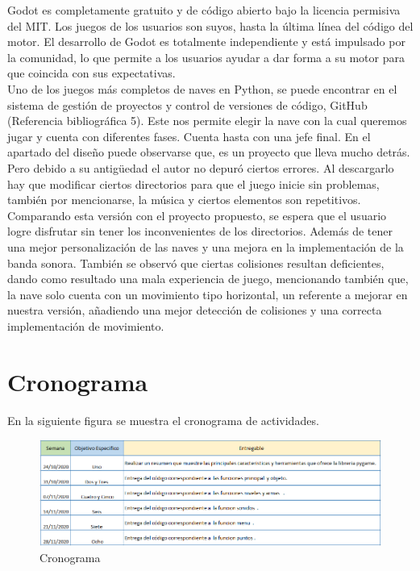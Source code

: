 \documentclass[12pt,letterpaper]{article}
\begin{document}
\indent Godot es completamente gratuito y de código abierto bajo la licencia permisiva del MIT. Los juegos de los usuarios son suyos, hasta la última línea del código del motor. El desarrollo de Godot es totalmente independiente y está impulsado por la comunidad, lo que permite a los usuarios ayudar a dar forma a su motor para que coincida con sus expectativas.
\vspace{5mm}\\
\indent Uno de los juegos más completos de naves en Python, se puede encontrar en el sistema de gestión de proyectos y control de versiones de código, GitHub (Referencia bibliográfica 5). Este nos permite elegir la nave con la cual queremos jugar y cuenta con diferentes fases. Cuenta hasta con una jefe final. En el apartado del diseño puede observarse que, es un proyecto que lleva mucho detrás. Pero debido a su antigüedad el autor no depuró ciertos errores. Al descargarlo hay que modificar ciertos directorios para que el juego inicie sin problemas, también por mencionarse, la música y ciertos elementos son repetitivos.\vspace{5mm}\\
\indent Comparando esta versión con el proyecto propuesto, se espera que el usuario logre disfrutar sin tener los inconvenientes de los directorios. Además de tener una mejor personalización de las naves y una mejora en la implementación de la banda sonora. También se observó que ciertas colisiones resultan deficientes, dando como resultado una mala experiencia de juego, mencionando también que, la nave solo cuenta con un movimiento tipo horizontal, un referente a mejorar en nuestra versión, añadiendo una mejor detección de colisiones y una correcta implementación de movimiento. 


  
\section{Cronograma} 
 En la siguiente figura se muestra el cronograma de actividades.  
\begin{figure}[H]
\centering
\includegraphics[width=16cm]{cronograma.PNG}
\caption{Cronograma}
\end{figure}
\end{document}
